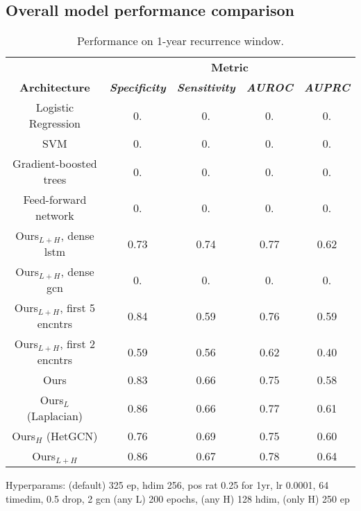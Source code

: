 \documentclass[conference]{IEEEtran}
\begin{document}
\subsection{Overall model performance comparison}

\begin{table}[htbp]
    \caption{Performance on 1-year recurrence window.}
    \begin{center}
    \begin{tabular}{|c|c|c|c|c|}
    \hline
    &\multicolumn{4}{|c|}{\textbf{Metric}} \\
    \cline{2-5} 
    \textbf{Architecture} & \textbf{\textit{Specificity}}& \textbf{\textit{Sensitivity}}& \textbf{\textit{AUROC}} &\textbf{\textit{AUPRC}}\\
    \hline
    Logistic Regression& 0. & 0. & 0. & 0. \\
    \hline
    SVM& 0. & 0. & 0. & 0. \\
    \hline
    Gradient-boosted trees& 0. & 0. & 0. & 0. \\
    \hline
    Feed-forward network& 0. & 0. & 0. & 0. \\
    \hline
    Ours$_{L+H}$, dense lstm& 0.73 & 0.74 & 0.77 & 0.62 \\
    \hline
    Ours$_{L+H}$, dense gcn& 0. & 0. & 0. & 0. \\
    \hline
    Ours$_{L+H}$, first 5 encntrs& 0.84 & 0.59 & 0.76 & 0.59 \\
    \hline
    Ours$_{L+H}$, first 2 encntrs& 0.59 & 0.56 & 0.62 & 0.40 \\
    \hline
    Ours & 0.83 & 0.66 & 0.75 & 0.58 \\
    \hline
    Ours$_L$ (Laplacian)& 0.86 & 0.66 & 0.77 & 0.61 \\
    \hline
    Ours$_H$ (HetGCN)& 0.76 & 0.69 & 0.75 & 0.60 \\
    \hline
    Ours$_{L+H}$& 0.86 & 0.67 & 0.78 & 0.64 \\
    \hline
    \end{tabular}
    \label{tab1}
    \end{center}
    \end{table}

{\color{red} Hyperparams: (default) 325 ep, hdim 256, pos rat 0.25 for 1yr, lr 0.0001, 64 timedim, 0.5 drop, 2 gcn (any L) 200 epochs, (any H) 128 hdim, (only H) 250 ep}
\end{document}
